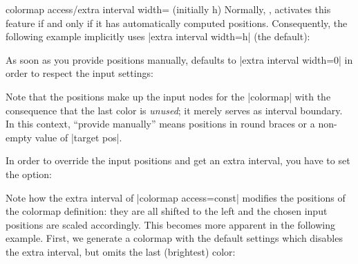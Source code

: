 {\begin{pgfplotskey}{colormap access/extra interval width= (initially h)}
    Normally, \PGFPlots{}, activates this feature if and only if it has
    automatically computed positions. Consequently, the following example
    implicitly uses |extra interval width=h| (the default):
\begin{codeexample}[]
\pgfplotscolorbardrawstandalone[
    colormap={example}{
        color=(blue)
        color=(red)
        color=(black)
    },
    colorbar horizontal,
    colorbar style={xtick=data},
    colormap access=const,
]
\end{codeexample}

    As soon as you provide positions manually, \PGFPlots{} defaults to
    |extra interval width=0| in order to respect the input settings:
\begin{codeexample}[]
\pgfplotscolorbardrawstandalone[
    colormap={example}{
        color(0)=(blue)
        color(500)=(red)
        color(1000)=(black)
    },
    colorbar horizontal,
    colorbar style={xtick=data},
    colormap access=const,
]
\end{codeexample}
    \noindent Note that the positions make up the input nodes for the
    |colormap| with the consequence that the last color is \emph{unused}; it
    merely serves as interval boundary. In this context, ``provide manually''
    means positions in round braces or a non-empty value of |target pos|.

    In order to override the input positions and get an extra interval, you
    have to set the option:
\begin{codeexample}[]
\pgfplotscolorbardrawstandalone[
    colormap={example}{
        color(0)=(blue)
        color(500)=(red)
        color(1000)=(black)
    },
    colorbar horizontal,
    colorbar style={xtick=data},
    colormap access/extra interval width=h,
    colormap access=const,
]
\end{codeexample}
    Note how the extra interval of |colormap access=const| modifies the
    positions of the colormap definition: they are all shifted to the left and
    the chosen input positions are scaled accordingly. This becomes more
    apparent in the following example. First, we generate a colormap with the
    default settings which disables the extra interval, but omits the last
    (brightest) color:
\begin{codeexample}[]
\pgfplotscolorbardrawstandalone[
    colormap={nonuniform}{
        of colormap={
            viridis,
            target pos={0,200,300,500,700,1000}
        },
    },
    colorbar horizontal,
    colormap access=const,
    colorbar style={xtick=data,font=\tiny,
        /pgf/number format/precision=0},
    colormap access=const,
]
\end{codeexample}


\end{pgfplotskey}}

